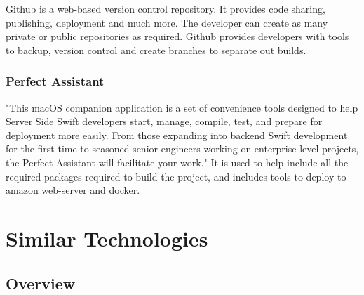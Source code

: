 Github \cite{github} is a web-based version control repository. It provides code sharing, publishing, deployment and much more. The developer can create as many private or public repositories as required. Github provides developers with tools to backup, version control and create branches to separate out builds.

\subsubsection{Perfect Assistant}
"This macOS companion application is a set of convenience tools designed to help Server Side Swift developers start, manage, compile, test, and prepare for deployment more easily. From those expanding into backend Swift development for the first time to seasoned senior engineers working on enterprise level projects, the Perfect Assistant will facilitate your work." \cite{perfectAssist} It is used to help include all the required packages required to build the project, and includes tools to deploy to amazon web-server and docker.



\section{Similar Technologies}

\subsection{Overview}

